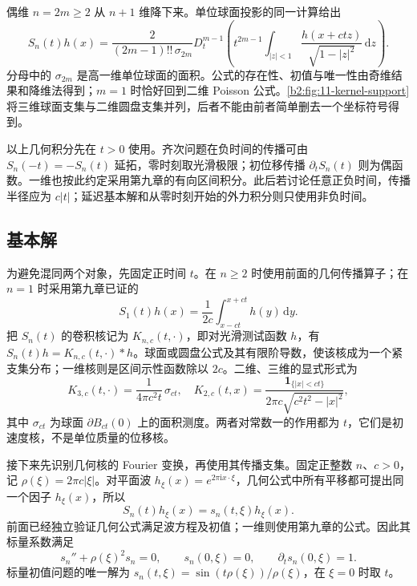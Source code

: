 偶维 \(n=2m\geq2\) 从 \(n+1\) 维降下来。单位球面投影的同一计算给出
\begin{equation}\label{b2:eq:11-even-wave}
 S_n(t)h(x)=\dfrac2{(2m-1)!!\,\sigma_{2m}}
 D_t^{m-1}\left(t^{2m-1}
 \int_{|z|<1}\dfrac{h(x+ctz)}{\sqrt{1-|z|^2}}\,\mathrm{d}z\right).
\end{equation}
分母中的 \(\sigma_{2m}\) 是高一维单位球面的面积。公式的存在性、初值与唯一性由奇维结果和降维法得到；\(m=1\) 时恰好回到二维 Poisson 公式。\cref{b2:fig:11-kernel-support}将三维球面支集与二维圆盘支集并列，后者不能由前者简单删去一个坐标符号得到。


以上几何积分先在 \(t>0\) 使用。齐次问题在负时间的传播可由 \(S_n(-t)=-S_n(t)\) 延拓，零时刻取光滑极限；初位移传播 \(\partial_tS_n(t)\) 则为偶函数。一维也按此约定采用第九章的有向区间积分。此后若讨论任意正负时间，传播半径应为 \(c|t|\)；延迟基本解和从零时刻开始的外力积分则只使用非负时间。

\subsection{基本解}
\label{b2:subsec:110302}

为避免混同两个对象，先固定正时间 \(t\)。在 \(n\geq2\) 时使用前面的几何传播算子；在 \(n=1\) 时采用第九章已证的
\[
 S_1(t)h(x)=\frac1{2c}\int_{x-ct}^{x+ct}h(y)\,\mathrm{d}y.
\]
把 \(S_n(t)\) 的卷积核记为 \(K_{n,c}(t,\cdot)\)，即对光滑测试函数 \(h\)，有 \(S_n(t)h=K_{n,c}(t,\cdot)*h\)。球面或圆盘公式及其有限阶导数，使该核成为一个紧支集分布；一维核则是区间示性函数除以 \(2c\)。二维、三维的显式形式为
\[
 K_{3,c}(t,\cdot)=\dfrac1{4\pi c^2t}\,\sigma_{ct},\quad
 K_{2,c}(t,x)=\dfrac{\mathbf1_{\{|x|<ct\}}}{2\pi c\sqrt{c^2t^2-|x|^2}},
\]
其中 \(\sigma_{ct}\) 为球面 \(\partial B_{ct}(0)\) 上的面积测度。两者对常数一的作用都为 \(t\)，它们是初速度核，不是单位质量的位移核。

\ProseParagraphBreak

接下来先识别几何核的 Fourier 变换，再使用其传播支集。固定正整数 \(n\)、\(c>0\)，记 \(\rho(\xi)=2\pi c|\xi|\)。对平面波 \(h_\xi(x)=e^{2\pi\mathrm{i}x\cdot\xi}\)，几何公式中所有平移都可提出同一个因子 \(h_\xi(x)\)，所以
\[
 S_n(t)h_\xi(x)=s_n(t,\xi)h_\xi(x).
\]
前面已经独立验证几何公式满足波方程及初值；一维则使用第九章的公式。因此其标量系数满足
\[
 s_n''+\rho(\xi)^2s_n=0,\qquad s_n(0,\xi)=0,\qquad
 \partial_ts_n(0,\xi)=1.
\]
标量初值问题的唯一解为 \(s_n(t,\xi)=\sin(t\rho(\xi))/\rho(\xi)\)，在 \(\xi=0\) 时取 \(t\)。

